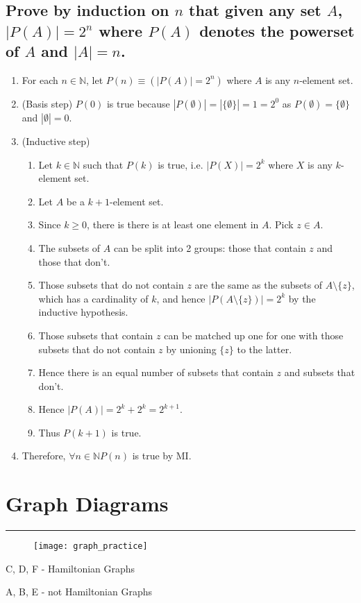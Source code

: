 \documentclass{article}
\begin{document}
\subsection*{Prove by induction on $n$ that given any set $A$, $|P(A)|=2^{n}$ where $P(A)$ denotes the powerset of $A$ and $|A|=n$.}
\begin{enumerate}
	\item For each $n\in\mathbb{N}$, let $P(n)\equiv (|P(A)|=2^{n})$ where $A$ is any $n$-element set.
	\item (Basis step) $P(0)$ is true because $|P(\emptyset)|=|\{\emptyset\}|=1=2^{0}$ as $P(\emptyset)=\{\emptyset\}$ and $|\emptyset|=0$.
	\item (Inductive step)
	\begin{enumerate}
		\item Let $k\in\mathbb{N}$ such that $P(k)$ is true, i.e. $|P(X)|=2^{k}$ where $X$ is any $k$-element set.
		\item Let $A$ be a $k+1$-element set.
		\item Since $k\geq 0$, there is there is at least one element in $A$. Pick $z\in A$.
		\item The subsets of $A$ can be split into 2 groups: those that contain $z$ and those that don’t.
		\item Those subsets that do not contain $z$ are the same as the subsets of $A\setminus \{z\}$, which has a cardinality of $k$, and hence $|P(A\setminus \{z\})|=2^{k}$ by the inductive hypothesis.
		\item Those subsets that contain $z$ can be matched up one for one with those subsets that do not contain $z$ by unioning $\{z\}$ to the latter.
		\item Hence there is an equal number of subsets that contain $z$ and subsets that don’t.
		\item Hence $|P(A)|=2^{k}+2^{k}=2^{k+1}$.
		\item Thus $P(k+1)$ is true.
	\end{enumerate}
	\item Therefore, $\forall n\in\mathbb{N} P(n)$ is true by MI.
\end{enumerate}

\endgroup


\newpage
\section*{Graph Diagrams}
\hrule
\vspace{0.5cm}

\begin{figure}[H]
	\centering
	\texttt{[image: graph\_practice]}
\end{figure} 
\begin{flushleft}
C, D, F - Hamiltonian Graphs 

A, B, E - not Hamiltonian Graphs
\end{flushleft}
\end{document}
